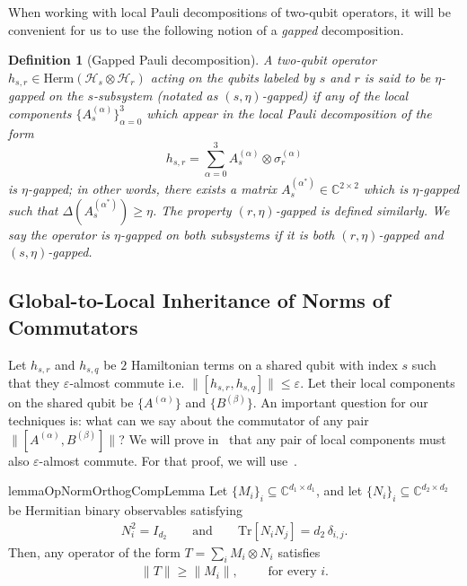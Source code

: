 \documentclass[a4paper,onecolumn,11pt]{quantumarticle}
\theoremstyle{plain}
\newtheorem{definition}[theorem]{Definition}
\newcommand{\eps}{\varepsilon}
\begin{document}
When working with local Pauli decompositions of two-qubit operators, it will be convenient for us to use the following notion of a \emph{gapped} decomposition.
\begin{definition}[Gapped Pauli decomposition]\label{def:gapped-pauli-decomp}
  A two-qubit operator $h_{s,r} \in \mathrm{Herm}(\mathcal{H}_s \otimes \mathcal{H}_r)$ acting on the qubits labeled by $s$ and $r$ is said to be $\eta$-gapped on the $s$-subsystem (notated as $(s, \eta)$-gapped) if any of the local components $\{A_s^{(\alpha)}\}_{\alpha=0}^3$ which appear in the local Pauli decomposition of the form
      \begin{equation}
        h_{s,r} = \sum\limits_{\alpha = 0}^{3} A_s^{(\alpha)} \otimes \sigma_r^{(\alpha)}
    \end{equation}
  is $\eta$-gapped; in other words, there exists a matrix $A_s^{(\alpha^*)} \in \mathbb{C}^{2 \times 2}$ which is $\eta$-gapped such that $\Delta(A_s^{(\alpha^*)}) \geq \eta$.
    The property $\left(r, \eta\right)$-gapped is defined similarly. We say the operator is $\eta$-gapped on both subsystems if it is both $\left(r, \eta\right)$-gapped and $\left(s, \eta\right)$-gapped.
\end{definition}

\subsection{Global-to-Local Inheritance of Norms of Commutators}
Let $h_{s,r}$ and $h_{s,q}$ be $2$ Hamiltonian terms on a shared qubit with index $s$ such that they $\eps$-almost commute i.e. $\|[h_{s,r}, h_{s,q}]\| \leq \eps$. Let their local components on the shared qubit be $\{A^{(\alpha)}\}$ and $\{B^{(\beta)}\}$. An important question for our techniques is: what can we say about the commutator of any pair $\|[A^{(\alpha)}, B^{(\beta)}]\|$? We will prove in~ that any pair of local components must also $\eps$-almost commute. For that proof, we will use~.

\begin{restatable}{lemma}{OpNormOrthogCompLemma}
\label{lem:opnorm-orthog-components}
Let $\{M_i\}_i \subseteq \mathbb{C}^{d_1 \times d_1}$, and let
$\{N_i\}_i \subseteq \mathbb{C}^{d_2 \times d_2}$ be Hermitian binary
observables satisfying
\begin{align}
    N_i^2 = I_{d_2}
    \qquad \text{and} \qquad
    \mathrm{Tr}[N_i N_j] = d_2\,\delta_{i,j}.
\end{align}
Then, any operator of the form
$T = \sum_i M_i \otimes N_i$ satisfies
\begin{align}
    \|T\| \geq \|M_i\|, \qquad \text{ for every $i$.}
\end{align}
\end{restatable}
\end{document}
